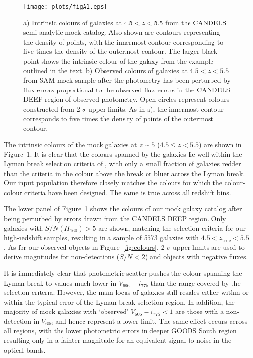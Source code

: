\begin{figure}
\centering
\texttt{[image: plots/figA1.eps]}
\caption{a) Intrinsic colours of galaxies at $4.5 < z < 5.5$ from the CANDELS semi-analytic mock catalog. Also shown are contours representing the density of points, with the innermost contour corresponding to five times the density of the outermost contour. The larger black point shows the intrinsic colour of the galaxy from the example outlined in the text. b) Observed colours of galaxies at $4.5 < z < 5.5$ from SAM mock sample after the photometry has been perturbed by flux errors proportional to the observed flux errors in the CANDELS DEEP region of observed photometry. Open circles represent colours constructed from 2-$\sigma$ upper limits. As in a), the innermost contour corresponds to five times the density of points of the outermost contour.}
\label{fig:mock_col}
\end{figure}

The intrinsic colours of the mock galaxies at $z \sim 5$ ($4.5 \leq z < 5.5$) are shown in Figure~\ref{fig:mock_col}. It is clear that the colours spanned by the galaxies lie well within the Lyman break selection criteria of \citet{2007ApJ...670..928B}, with only a small fraction of galaxies redder than the criteria in the colour above the break or bluer across the Lyman break. Our input population therefore closely matches the colours for which the colour-colour criteria have been designed. The same is true across all redshift bins. 

The lower panel of Figure~\ref{fig:mock_col} shows the colours of our mock galaxy catalog after being perturbed by errors drawn from the CANDELS DEEP region. Only galaxies with $S/N(H_{160}) > 5$ are shown, matching the selection criteria for our high-redshift samples, resulting in a sample of 5673 galaxies with $4.5 < z_{\text{true}} < 5.5$. As for our observed objects in Figure~\ref{fig:colours}, 2-$\sigma$ upper-limits are used to derive magnitudes for non-detections ($S/N < 2$) and objects with negative fluxes.  

It is immediately clear that photometric scatter pushes the colour spanning the Lyman break to values much lower in $V_{606} - i_{775}$ than the range covered by the selection criteria. However, the main locus of galaxies still resides either within or within the typical error of the Lyman break selection region. In addition, the majority of mock galaxies with `observed' $V_{606} - i_{775} < 1$ are those with a non-detection in $V_{606}$ and hence represent a lower limit. The same effect occurs across all regions, with the lower photometric errors in deeper GOODS South region resulting only in a fainter magnitude for an equivalent signal to noise in the optical bands. 

